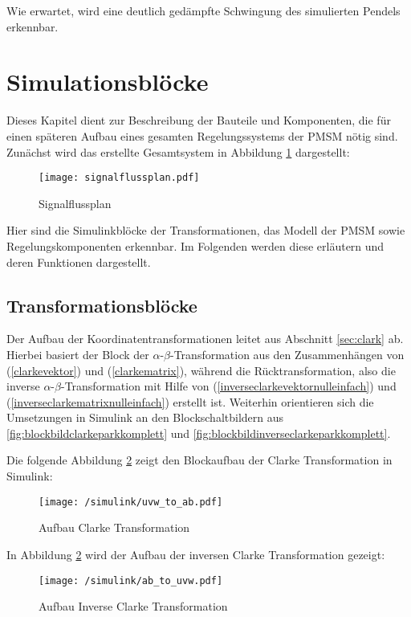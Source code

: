Wie erwartet, wird eine deutlich gedämpfte Schwingung des simulierten Pendels erkennbar.

\section{Simulationsblöcke}\label{sec:math-model-pmsm}

Dieses Kapitel dient zur Beschreibung der Bauteile und Komponenten, die für einen späteren Aufbau eines gesamten Regelungssystems der PMSM nötig sind.
Zunächst wird das erstellte Gesamtsystem in Abbildung \ref{fig:signalflussplan} dargestellt:

\begin{figure}[h]
	\centering
	\texttt{[image: signalflussplan.pdf]}
	\label{fig:signalflussplan}
	\caption{Signalflussplan}
\end{figure}

Hier sind die Simulinkblöcke der Transformationen, das Modell der PMSM sowie Regelungskomponenten erkennbar.
Im Folgenden werden diese erläutern und deren Funktionen dargestellt.

\subsection{Transformationsblöcke}

Der Aufbau der Koordinatentransformationen leitet aus Abschnitt \ref{sec:clark} ab. 
Hierbei basiert der Block der $\alpha$-$\beta$-Transformation aus den Zusammenhängen von (\ref{clarkevektor}) und (\ref{clarkematrix}), während die Rücktransformation, also die inverse $\alpha$-$\beta$-Transformation mit Hilfe von (\ref{inverseclarkevektornulleinfach}) und (\ref{inverseclarkematrixnulleinfach}) erstellt ist.
Weiterhin orientieren sich die Umsetzungen in Simulink an den Blockschaltbildern aus \ref{fig:blockbildclarkeparkkomplett} und \ref{fig:blockbildinverseclarkeparkkomplett}.

Die folgende Abbildung \ref{fig:uvw_to_ab} zeigt den Blockaufbau der Clarke Transformation in Simulink:

\begin{figure}[h]
	\centering
	\texttt{[image: /simulink/uvw\_to\_ab.pdf]}
	\label{fig:uvw_to_ab}
	\caption{Aufbau Clarke Transformation}
\end{figure}

In Abbildung \ref{fig:uvw_to_ab} wird der Aufbau der inversen Clarke Transformation gezeigt:

\begin{figure}[h]
	\centering
	\texttt{[image: /simulink/ab\_to\_uvw.pdf]}
	\label{fig:ab_to_uvw}
	\caption{Aufbau Inverse Clarke Transformation}
\end{figure}

